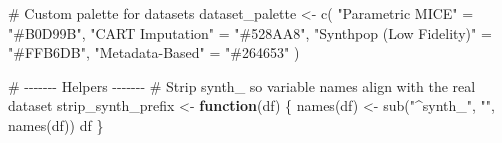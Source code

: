 \documentclass[
  letterpaper,
  DIV=11,
  numbers=noendperiod]{scrartcl}
\newenvironment{Shaded}{\begin{snugshade}}{\end{snugshade}}
\newcommand{\CommentTok}[1]{\textcolor[rgb]{0.37,0.37,0.37}{#1}}
\newcommand{\ControlFlowTok}[1]{\textcolor[rgb]{0.00,0.23,0.31}{\textbf{#1}}}
\newcommand{\FunctionTok}[1]{\textcolor[rgb]{0.28,0.35,0.67}{#1}}
\newcommand{\NormalTok}[1]{\textcolor[rgb]{0.00,0.23,0.31}{#1}}
\newcommand{\OtherTok}[1]{\textcolor[rgb]{0.00,0.23,0.31}{#1}}
\newcommand{\StringTok}[1]{\textcolor[rgb]{0.13,0.47,0.30}{#1}}
\begin{document}
\begin{Shaded}
\begin{Highlighting}[]
\CommentTok{\# Custom palette for datasets}
\NormalTok{dataset\_palette }\OtherTok{\textless{}{-}} \FunctionTok{c}\NormalTok{(}
  \StringTok{"Parametric MICE"}         \OtherTok{=} \StringTok{"\#B0D99B"}\NormalTok{,}
  \StringTok{"CART Imputation"}         \OtherTok{=} \StringTok{"\#528AA8"}\NormalTok{,}
  \StringTok{"Synthpop (Low Fidelity)"} \OtherTok{=} \StringTok{"\#FFB6DB"}\NormalTok{,}
  \StringTok{"Metadata{-}Based"}          \OtherTok{=} \StringTok{"\#264653"}
\NormalTok{)}

\CommentTok{\# {-}{-}{-}{-}{-}{-}{-} Helpers {-}{-}{-}{-}{-}{-}{-}}
\CommentTok{\# Strip \textquotesingle{}synth\_\textquotesingle{} so variable names align with the real dataset}
\NormalTok{strip\_synth\_prefix }\OtherTok{\textless{}{-}} \ControlFlowTok{function}\NormalTok{(df) \{}
  \FunctionTok{names}\NormalTok{(df) }\OtherTok{\textless{}{-}} \FunctionTok{sub}\NormalTok{(}\StringTok{"\^{}synth\_"}\NormalTok{, }\StringTok{""}\NormalTok{, }\FunctionTok{names}\NormalTok{(df))}
\NormalTok{  df}
\NormalTok{\}}


\end{Highlighting}
\end{Shaded}
\end{document}
